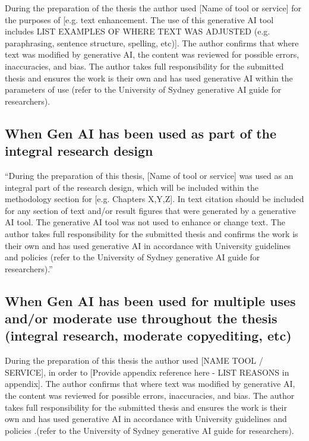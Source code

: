 During the preparation of the thesis the author used [Name of tool or service] for the purposes of [e.g. text enhancement. The use of this generative AI tool includes LIST EXAMPLES OF WHERE TEXT WAS ADJUSTED (e.g. paraphrasing, sentence structure, spelling, etc)].  The author confirms that where text was modified by generative AI, the content was reviewed for possible errors, inaccuracies, and bias. The author takes full responsibility for the submitted thesis and ensures the work is their own and has used generative AI within the parameters of use (refer to the University of Sydney generative AI guide for researchers).

\subsection*{When Gen AI has been used as part of the integral research design}

“During the preparation of this thesis, [Name of tool or service] was used as an integral part of the research design, which will be included within the methodology section for [e.g. Chapters X,Y,Z]. In text citation should be included for any section of text and/or result figures that were generated by a generative AI tool.  The generative AI tool was not used to enhance or change text. The author takes full responsibility for the submitted thesis and confirms the work is their own and has used generative AI in accordance with University guidelines and policies (refer to the University of Sydney generative AI guide for researchers).”

\subsection*{When Gen AI has been used for multiple uses and/or moderate use throughout the thesis (integral research, moderate copyediting, etc)}

During the preparation of this thesis the author used [NAME TOOL / SERVICE], in order to [Provide appendix reference here - LIST REASONS in appendix]. The author confirms that where text was modified by generative AI, the content was reviewed for possible errors, inaccuracies, and bias. The author takes full responsibility for the submitted thesis and ensures the work is their own and has used generative AI in accordance with University  guidelines and policies .(refer to the University of Sydney generative AI guide for researchers).



\citereset